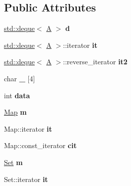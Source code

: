 \subsection*{Public Attributes}
\begin{DoxyCompactItemize}
\item 
\mbox{\label{struct_a_a6265630aee7da5950cee162abe6721db}} 
\mbox{\hyperlink{classstd_1_1deque}{std\+::deque}}$<$ \mbox{\hyperlink{struct_a}{A}} $>$ {\bfseries d}
\item 
\mbox{\label{struct_a_afdc08c50d1e94761ea76acd43252c658}} 
\mbox{\hyperlink{classstd_1_1deque}{std\+::deque}}$<$ \mbox{\hyperlink{struct_a}{A}} $>$\+::iterator {\bfseries it}
\item 
\mbox{\label{struct_a_ad82757089c1f570c65141446ba2e9004}} 
\mbox{\hyperlink{classstd_1_1deque}{std\+::deque}}$<$ \mbox{\hyperlink{struct_a}{A}} $>$\+::reverse\+\_\+iterator {\bfseries it2}
\item 
\mbox{\label{struct_a_a861161fbb938d26dbdda5c973218a14e}} 
char {\bfseries \+\_\+} \mbox{[}4\mbox{]}
\item 
\mbox{\label{struct_a_ad6e881ac08b88b2c01aa485e1c21c1c2}} 
int {\bfseries data}
\item 
\mbox{\label{struct_a_a9399ecda99620e60247d179e35400002}} 
\mbox{\hyperlink{classstd_1_1map}{Map}} {\bfseries m}
\item 
\mbox{\label{struct_a_afdc08c50d1e94761ea76acd43252c658}} 
Map\+::iterator {\bfseries it}
\item 
\mbox{\label{struct_a_a2124dd425d7df03283bf9b083956ebd6}} 
Map\+::const\+\_\+iterator {\bfseries cit}
\item 
\mbox{\label{struct_a_a3a2d7d14a28f36d9706c15503bf015b9}} 
\mbox{\hyperlink{classstd_1_1multiset}{Set}} {\bfseries m}
\item 
\mbox{\label{struct_a_ab41f45080a9ec14b5e9cf380a3b0fd00}} 
Set\+::iterator {\bfseries it}
\item 
\mbox{\label{struct_a_a57efd43b0a163faf7b6ba20111b45183}} 

\end{DoxyCompactItemize}
